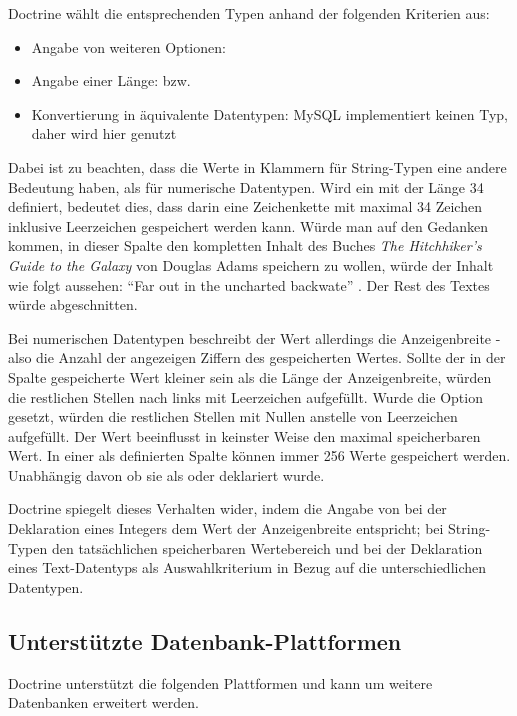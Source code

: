 Doctrine wählt die entsprechenden Typen anhand der folgenden Kriterien aus:

\begin{itemize}
	\item Angabe von weiteren Optionen: 
	\item Angabe einer Länge:  bzw. 
	\item Konvertierung in äquivalente Datentypen: MySQL implementiert keinen  Typ, daher wird hier  genutzt
\end{itemize}

Dabei ist zu beachten, dass die Werte in Klammern für String-Typen eine andere Bedeutung haben, als für numerische Datentypen. Wird ein  mit der Länge 34 definiert, bedeutet dies, dass darin eine Zeichenkette mit maximal 34 Zeichen inklusive Leerzeichen gespeichert werden kann. Würde man auf den Gedanken kommen, in dieser Spalte den kompletten Inhalt des Buches \textit{The Hitchhiker's Guide to the Galaxy} von Douglas Adams speichern zu wollen, würde der Inhalt wie folgt aussehen: ``Far out in the uncharted backwate'' \cite[S. 3]{book:adamsHitchhikers1995}. Der Rest des Textes würde abgeschnitten.

Bei numerischen Datentypen beschreibt der Wert allerdings die Anzeigenbreite - also die Anzahl der angezeigen Ziffern des gespeicherten Wertes. Sollte der in der Spalte gespeicherte Wert kleiner sein als die Länge der Anzeigenbreite, würden die restlichen Stellen nach links mit Leerzeichen aufgefüllt. Wurde die Option  gesetzt, würden die restlichen Stellen mit Nullen anstelle von Leerzeichen aufgefüllt. Der Wert beeinflusst in keinster Weise den maximal speicherbaren Wert. In einer als  definierten Spalte können immer 256 Werte gespeichert werden. Unabhängig davon ob sie als  oder  deklariert wurde.

Doctrine spiegelt dieses Verhalten wider, indem die Angabe von  bei der Deklaration eines Integers dem Wert der Anzeigenbreite entspricht; bei String-Typen den tatsächlichen speicherbaren Wertebereich und bei der Deklaration eines Text-Datentyps als Auswahlkriterium in Bezug auf die unterschiedlichen  Datentypen.

\subsection{Unterstützte Datenbank-Plattformen}
\label{basics:doctrine:subsec:supportedPlatforms}
Doctrine unterstützt die folgenden Plattformen und kann um weitere Datenbanken erweitert werden.

